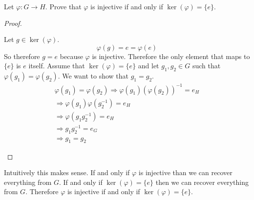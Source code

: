 \documentclass[class=scrartcl, crop=false]{standalone}
\begin{document}
\begin{exercise}
  Let $\varphi:G \to H$.  Prove that $\varphi$ is injective if and only if $\ker(\varphi) = \{e\}$.
  \begin{proof}
    \begin{itemize}
      \ii[]
      \ii[$(\Rightarrow)$]
      Let $g \in \ker(\varphi)$.
      \[
        \varphi(g) = e = \varphi(e)
      \]
      So therefore $g = e$ because $\varphi$ is injective. Therefore the only element that maps to $\{e\}$ is $e$ itself.
      \ii[$(\Leftarrow)$]
      Assume that $\ker(\varphi) = \{e\}$ and let $g_1, g_2 \in G$ such that $\varphi(g_1) = \varphi(g_2)$. We want to show that $g_1 = g_2$.
      \begin{gather*}
        \varphi(g_1) = \varphi(g_2) \Rightarrow \varphi(g_1)(\varphi(g_2))^{-1} = e_H \\
        \Rightarrow \varphi(g_1)\varphi(g_2^{-1}) = e_H \\
        \Rightarrow \varphi(g_1g_2^{-1}) = e_H \\
        \Rightarrow g_1g_2^{-1} = e_G \\
        \Rightarrow g_1 = g_2
      \end{gather*} 

    \end{itemize} 
  \end{proof} \noindent
  Intuitively this makes sense. If and only if $\varphi$ is injective than we can recover everything from $G$. If and only if $\ker(\varphi) = \{e\}$ then we can recover everything from $G$. Therefore $\varphi$ is injective if and only if $\ker(\varphi) = \{e\}$.
\end{exercise} 
\end{document}
